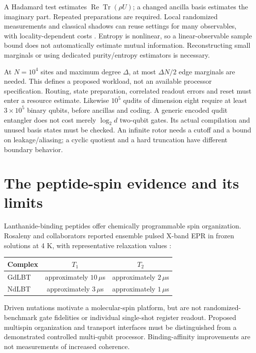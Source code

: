 \documentclass[11pt,oneside,openany]{book}
\theoremstyle{definition}\newtheorem{definition}[theorem]{Definition}
\theoremstyle{remark}\newtheorem{remark}[theorem]{Remark}
\begin{document}
A Hadamard test estimates $\operatorname{Re}\operatorname{Tr}(\rho U)$;
a changed ancilla basis estimates the imaginary part. Repeated preparations
are required. Local randomized measurements and classical shadows can
reuse settings for many observables, with locality-dependent costs
\cite{PhysShadows}. Entropy is nonlinear, so a linear-observable sample
bound does not automatically estimate mutual information. Reconstructing
small marginals or using dedicated purity/entropy estimators is necessary.

At $N=10^4$ sites and maximum degree $\Delta$, at most $\Delta N/2$
edge marginals are needed. This defines a proposed workload, not an
available processor specification. Routing, state preparation, correlated
readout errors and reset must enter a resource estimate. Likewise $10^5$
qudits of dimension eight require at least $3\times10^5$ binary qubits,
before ancillas and coding. A generic encoded qudit entangler does not
cost merely $\log_2d$ two-qubit gates. Its actual compilation and unused
basis states must be checked. An infinite rotor needs a cutoff and a
bound on leakage/aliasing; a cyclic quotient and a hard truncation have
different boundary behavior.

\section{The peptide-spin evidence and its limits}
Lanthanide-binding peptides offer chemically programmable spin organization.
Rosaleny and collaborators reported ensemble pulsed X-band EPR in frozen
solutions at 4 K, with representative relaxation values
\cite{PhysRosaleny}:
\begin{center}
\begin{tabular}{lcc}
\toprule
Complex & $T_1$ & $T_2$\\\midrule
GdLBT & approximately $10\,\mu$s & approximately $2\,\mu$s\\
NdLBT & approximately $3\,\mu$s & approximately $1\,\mu$s\\\bottomrule
\end{tabular}
\end{center}
Driven nutations motivate a molecular-spin platform, but are not
randomized-benchmark gate fidelities or individual single-shot register
readout. Proposed multispin organization and transport interfaces must
be distinguished from a demonstrated controlled multi-qubit processor.
Binding-affinity improvements are not measurements of increased coherence.
\end{document}
